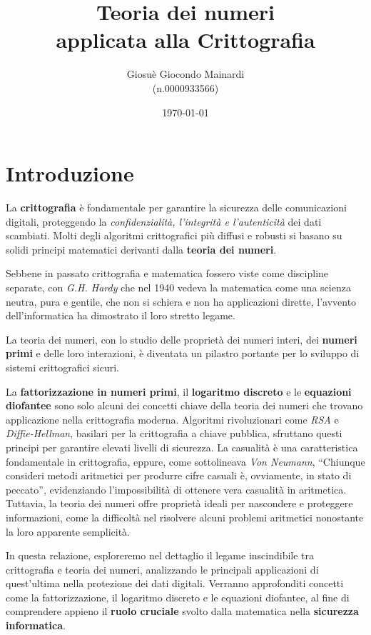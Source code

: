 \documentclass[a4paper,12pt]{report}
\title{Teoria dei numeri \\ applicata alla Crittografia}
\author{Giosuè Giocondo Mainardi\\ (n.0000933566)}
\date{\today}
\begin{document}
\maketitle

\tableofcontents
\chapter{Introduzione}
La \textbf{crittografia} è fondamentale per garantire la sicurezza delle comunicazioni digitali, proteggendo la \emph{confidenzialità, l'integrità e l'autenticità} dei dati scambiati. 
Molti degli algoritmi crittografici più diffusi e robusti si basano su solidi principi matematici derivanti dalla \textbf{teoria dei numeri}. 

Sebbene in passato crittografia e matematica fossero viste come discipline separate, con \emph{G.H. Hardy} che nel 1940 vedeva la matematica come una scienza neutra, pura e gentile,
che non si schiera e non ha applicazioni dirette, l'avvento dell'informatica ha dimostrato il loro stretto legame. 

La teoria dei numeri, con lo studio delle proprietà dei numeri interi, dei \textbf{numeri primi} e delle loro interazioni, è diventata un pilastro portante per lo sviluppo di sistemi crittografici sicuri.

La \textbf{fattorizzazione in numeri primi}, il \textbf{logaritmo discreto} e le \textbf{equazioni diofantee} sono solo alcuni dei concetti chiave della teoria dei numeri che trovano 
applicazione nella crittografia moderna. Algoritmi rivoluzionari come \emph{RSA} e \emph{Diffie-Hellman}, basilari per la crittografia a chiave pubblica, sfruttano questi principi 
per garantire elevati livelli di sicurezza. La casualità è una caratteristica fondamentale in crittografia, eppure, come sottolineava \emph{Von Neumann}, 
``Chiunque consideri metodi aritmetici per produrre cifre casuali è, ovviamente, in stato di peccato'', evidenziando l'impossibilità di ottenere vera casualità in aritmetica. 
Tuttavia, la teoria dei numeri offre proprietà ideali per nascondere e proteggere informazioni, come la difficoltà nel risolvere alcuni problemi aritmetici nonostante la loro apparente semplicità.

In questa relazione, esploreremo nel dettaglio il legame inscindibile tra crittografia e teoria dei numeri, analizzando le principali applicazioni di quest'ultima nella protezione dei dati digitali. 
Verranno approfonditi concetti come la fattorizzazione, il logaritmo discreto e le equazioni diofantee, al fine di comprendere appieno il \textbf{ruolo cruciale} svolto dalla matematica nella \textbf{sicurezza informatica}.
%
%
%
%
\end{document}
